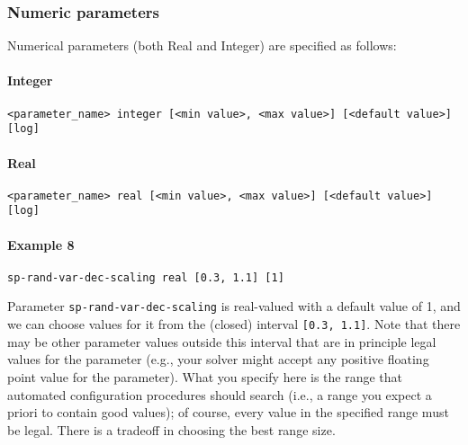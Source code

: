 \documentclass[manual.tex]{subfiles}
\begin{document}
\subsubsection*{Numeric parameters} \label{sec:numerical-params}
Numerical parameters (both Real and Integer) are specified as follows:

\paragraph{Integer}

\begin{verbatim}
<parameter_name> integer [<min value>, <max value>] [<default value>] [log]
\end{verbatim}

\paragraph{Real}

\begin{verbatim}
<parameter_name> real [<min value>, <max value>] [<default value>] [log]
\end{verbatim}



\paragraph{Example 8}

\begin{verbatim}
sp-rand-var-dec-scaling real [0.3, 1.1] [1]
\end{verbatim}
Parameter \texttt{sp-rand-var-dec-scaling} is real-valued with a default value of 1, and we can choose values for it from the (closed) interval \texttt{[0.3, 1.1]}.
Note that there may be other parameter values outside this interval that are in principle legal values for the parameter (e.g., your solver might accept any positive floating point value for the parameter). What you specify here is the range that automated configuration procedures should search (i.e., a range you expect a priori to contain good values); of course, every value in the specified range must be legal. There is a tradeoff in choosing the best range size.%
\end{document}
